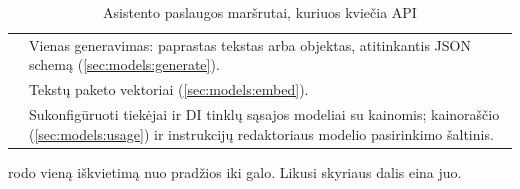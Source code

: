 \begin{table}[H]
\caption{Asistento paslaugos maršrutai, kuriuos kviečia API}\label{tab:models:routes}
\begin{tabularx}{\textwidth}{@{}L{58mm}Y@{}}
\toprule
{} &  \\
\midrule
{} & Vienas generavimas: paprastas tekstas arba objektas, atitinkantis JSON schemą (\cref{sec:models:generate}). \\
 & Tekstų paketo vektoriai (\cref{sec:models:embed}). \\
 & Sukonfigūruoti tiekėjai ir DI tinklų sąsajos modeliai su kainomis; kainoraščio (\cref{sec:models:usage}) ir instrukcijų redaktoriaus modelio pasirinkimo šaltinis. \\
\bottomrule
\end{tabularx}
\end{table}

 rodo vieną iškvietimą nuo pradžios iki galo. Likusi skyriaus dalis
eina juo.

